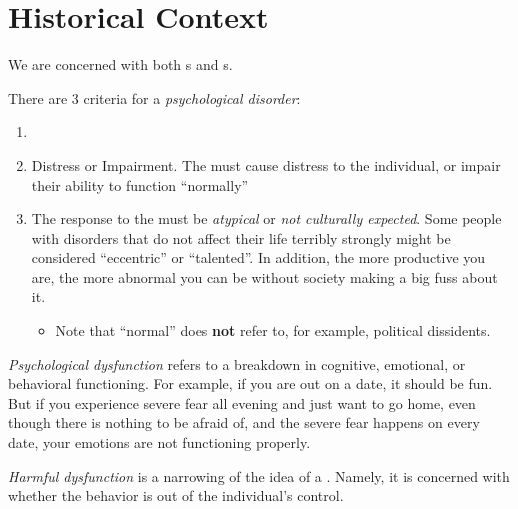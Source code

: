 \section{Historical Context}\label{sec:Historical_Context}
We are concerned with both s and s.

\begin{definition}\label{def:Psychological_Disorder}
  There are 3 criteria for a \emph{psychological disorder}:
  \begin{enumerate}[noitemsep]
  \item {}
  \item Distress or Impairment.
    The  must cause distress to the individual, or impair their ability to function ``normally''
  \item The response to the  must be \emph{atypical} or \emph{not culturally expected}.
    Some people with disorders that do not affect their life terribly strongly might be considered ``eccentric'' or ``talented''.
    In addition, the more productive you are, the more abnormal you can be without society making a big fuss about it.
    \begin{itemize}[noitemsep]
    \item Note that ``normal'' does \textbf{not} refer to, for example, political dissidents.
    \end{itemize}
  \end{enumerate}
\end{definition}

\begin{definition}\label{def:Psychological_Dysfunction}
  \emph{Psychological dysfunction} refers to a breakdown in cognitive, emotional, or behavioral functioning.
  For example, if you are out on a date, it should be fun.
  But if you experience severe fear all evening and just want to go home, even though there is nothing to be afraid of, and the severe fear happens on every date, your emotions are not functioning properly.

  \begin{remark}\label{rmk:Harmful_Dysfunction}
    \emph{Harmful dysfunction} is a narrowing of the idea of a .
    Namely, it is concerned with whether the behavior is out of the individual's control.
  \end{remark}
\end{definition}

